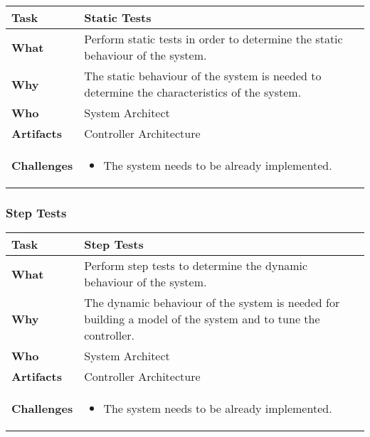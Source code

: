 \begin{tabularx}{\textwidth}{@{} l X @{}}
	\caption{Static Tests} \label{table:ch6_Task_Static_Tests}\\
	\toprule 
	\bfseries Task & Static Tests\\
	\midrule 
	\bfseries What & Perform static tests in order to determine the static behaviour of the system.\\
	\midrule 
	\bfseries Why & The static behaviour of the system is needed to determine the characteristics of the system.\\
	\midrule 
	\bfseries Who & System Architect\\
	\midrule 
	\bfseries Artifacts & Controller Architecture\\
	\midrule 
	\bfseries Challenges & 
	\begin{itemize}
		\item The system needs to be already implemented.
	\end{itemize}
	\\
	\bottomrule 
\end{tabularx}


\subsubsection{Step Tests}

\begin{tabularx}{\textwidth}{@{} l X @{}}
	\caption{Step Tests} \label{table:ch6_Task_Step_Tests}\\
	\toprule 
	\bfseries Task & Step Tests\\
	\midrule 
	\bfseries What & Perform step tests to determine the dynamic behaviour of the system.\\
	\midrule 
	\bfseries Why & The dynamic behaviour of the system is needed for building a model of the system and to tune the controller.\\
	\midrule 
	\bfseries Who & System Architect\\
	\midrule 
	\bfseries Artifacts & Controller Architecture\\
	\midrule 
	\bfseries Challenges & 
	\begin{itemize}
		\item The system needs to be already implemented.
	\end{itemize}
	\\
	\bottomrule 
\end{tabularx}


